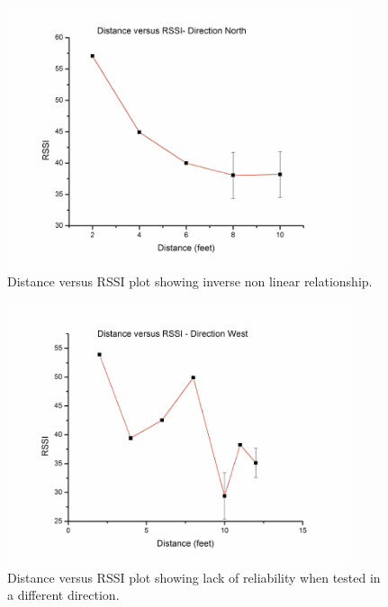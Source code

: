 \documentclass[10pt,a4paper]{article}
\begin{document}
\begin{figure}[H]
\centering
\includegraphics[width=0.9\textwidth]{North.pdf}
\caption{Distance versus RSSI plot showing inverse non linear
relationship.\cite{RSSI}}
\label{North}
\end{figure}

\begin{figure}[H]
\centering
\includegraphics[width=0.9\textwidth]{West.pdf}
\caption{Distance versus RSSI plot showing lack of
reliability when tested in a different direction.\cite{RSSI}} 
\label{West}
\end{figure}
\end{document}
